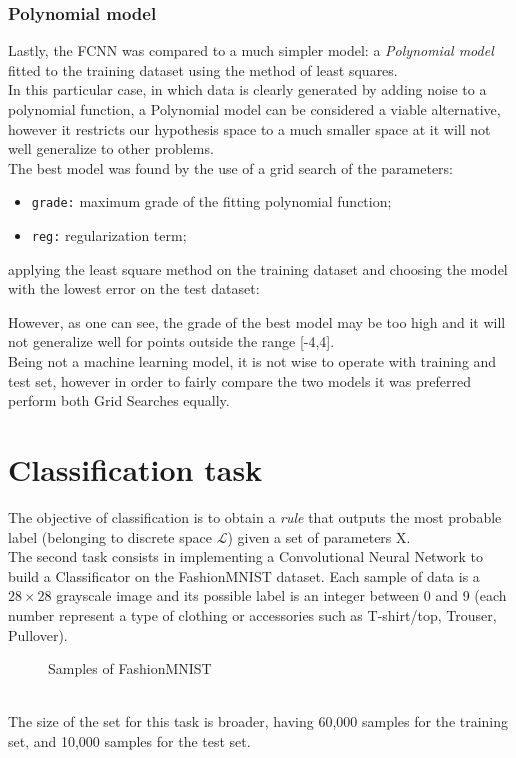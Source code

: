 \documentclass[11pt,a4paper,twocolumn]{IEEEtran}
\begin{document}
				\subsubsection{Polynomial model}
					Lastly, the FCNN was compared to a much simpler model: a \textit{Polynomial model} fitted to the training dataset using the method of least squares.\\
					In this particular case, in which data is clearly generated by adding noise to a polynomial function, a Polynomial model can be considered a viable alternative, however it restricts our hypothesis space to a much smaller space at it will not well generalize to other problems.\medskip\\
					The best model was found by the use of a grid search of the parameters:
					\begin{itemize}
						\item \texttt{grade:} maximum grade of the fitting polynomial function;
						\item \texttt{reg:} regularization term;
					\end{itemize}
					applying the least square method on the training dataset and choosing the model with the lowest error on the test dataset:\newpage
					\begin{figure}[h]
						\centering
						
					\end{figure}
					However, as one can see, the grade of the best model may be too high and it will not generalize well for points outside the range [-4,4].\medskip\\
					Being not a machine learning model, it is not wise to operate with training and test set, however in order to fairly compare the two models it was preferred perform both Grid Searches equally.
	\section{\textbf{Classification task}}
		The objective of classification is to obtain a \textit{rule} that outputs the most probable label (belonging to discrete space $\mathcal{L}$) given a set of parameters X.\medskip\\
		The second task consists in implementing a Convolutional Neural Network to build a Classificator on the FashionMNIST dataset\cite{xiao2017fashion}. Each sample of data is a $28\times28$ grayscale image and its possible label is an integer between 0 and 9 (each number represent a type of clothing or accessories such as T-shirt/top, Trouser, Pullover).\vspace*{-.5cm}
		\begin{figure}[h]
			\centering
			
			\caption{Samples of FashionMNIST}
		\end{figure}\\
		The size of the set for this task is broader, having 60,000 samples for the training set, and 10,000 samples for the test set.
\end{document}
